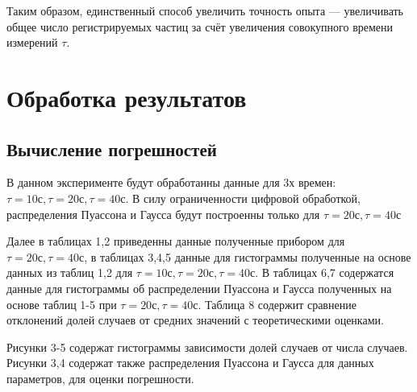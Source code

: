 \documentclass[a4paper]{article}
\begin{document}
Таким образом, единственный способ увеличить точность опыта — увеличивать общее число регистрируемых частиц за счёт увеличения совокупного времени измерений $\tau$.

\section{Обработка результатов}
\subsection{Вычисление погрешностей}

В данном эксперименте будут обработанны данные для 3х времен: $\tau = 10\text{с}, \tau = 20\text{с}, \tau = 40\text{с}$. В силу ограниченности цифровой обработкой, распределения Пуассона и Гаусса будут построенны только для $\tau = 20\text{с}, \tau = 40\text{с}$

Далее в таблицах 1,2 приведенны данные полученные прибором для $\tau = 20\text{с}, \tau = 40\text{с}$, в таблицах 3,4,5 данные для гистограммы полученные на основе данных из таблиц 1,2 для $\tau = 10\text{с}, \tau = 20\text{с}, \tau = 40\text{с}$. В таблицах 6,7 содержатся данные для гистограммы об распределении Пуассона и Гаусса полученных на основе таблиц 1-5 при  $\tau = 20\text{с}, \tau = 40\text{с}$. Таблица 8 содержит сравнение отклонений долей случаев от средних значений с теоретическими оценками. 

Рисунки 3-5 содержат гистограммы зависимости долей случаев от числа случаев. Рисунки 3,4 содержат также распределения Пуассона и Гаусса для данных параметров, для оценки погрешности.
\end{document}
